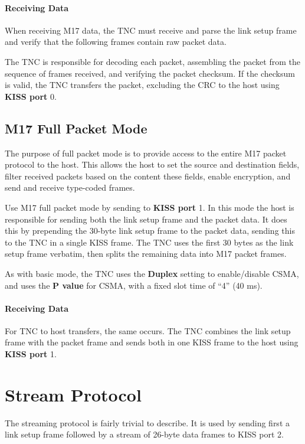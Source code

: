 \documentclass[a4paper,11pt,oneside]{book}
\begin{document}
\paragraph{Receiving Data}

When receiving M17 data, the TNC must receive and parse the link setup frame and verify that the following frames contain raw packet data.

The TNC is responsible for decoding each packet, assembling the packet from the sequence of frames received, and verifying the packet checksum. If the checksum is valid, the TNC transfers the packet, excluding the CRC to the host using \textbf{KISS port} 0.

\subsection{M17 Full Packet Mode}

The purpose of full packet mode is to provide access to the entire M17 packet protocol to the host. This allows the host to set the source and destination fields, filter received packets based on the content these fields, enable encryption, and send and receive type-coded frames.

Use M17 full packet mode by sending to \textbf{KISS port} 1. In this mode the host is responsible for sending both the link setup frame and the packet data. It does this by prepending the 30-byte link setup frame to the packet data, sending this to the TNC in a single KISS frame. The TNC uses the first 30 bytes as the link setup frame verbatim, then splits the remaining data into M17 packet frames.

As with basic mode, the TNC uses the \textbf{Duplex} setting to enable/disable CSMA, and uses the \textbf{P value} for CSMA, with a fixed slot time of ``4'' (40 ms).

\paragraph{Receiving Data}

For TNC to host transfers, the same occurs. The TNC combines the link setup frame with the packet frame and sends both in one KISS frame to the host using \textbf{KISS port} 1.

\section{Stream Protocol}

The streaming protocol is fairly trivial to describe. It is used by sending first a link setup frame followed by a stream of 26-byte data frames to KISS port 2.
\end{document}
